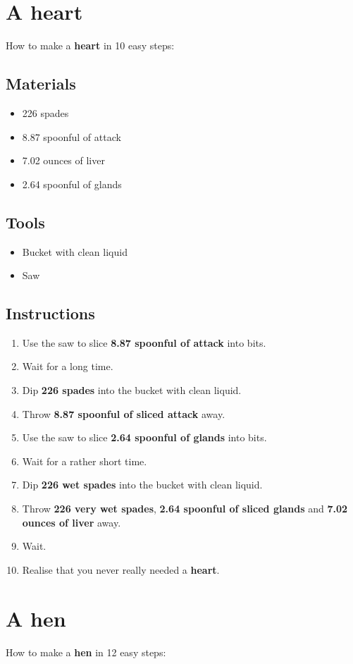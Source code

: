 \documentclass{article}
\begin{document}
\section{A heart}How to make a \textbf{heart} in 10 easy steps:

\subsection{Materials}\begin{itemize}
\item 
226 spades
\item 
8.87 spoonful of attack
\item 
7.02 ounces of liver
\item 
2.64 spoonful of glands
\end{itemize}
\subsection{Tools}\begin{itemize}
\item 
Bucket with clean liquid
\item 
Saw
\end{itemize}
\subsection{Instructions}\begin{enumerate}
\item 
Use the saw to slice \textbf{8.87 spoonful of attack} into bits.
\item 
Wait for a long time.
\item 
Dip \textbf{226 spades} into the bucket with clean liquid.
\item 
Throw \textbf{8.87 spoonful of sliced attack} away.
\item 
Use the saw to slice \textbf{2.64 spoonful of glands} into bits.
\item 
Wait for a rather short time.
\item 
Dip \textbf{226 wet spades} into the bucket with clean liquid.
\item 
Throw \textbf{226 very wet spades}, \textbf{2.64 spoonful of sliced glands} and \textbf{7.02 ounces of liver} away.
\item 
Wait.
\item 
Realise that you never really needed a \textbf{heart}.
\end{enumerate}
\newpage
\section{A hen}How to make a \textbf{hen} in 12 easy steps:
\end{document}
